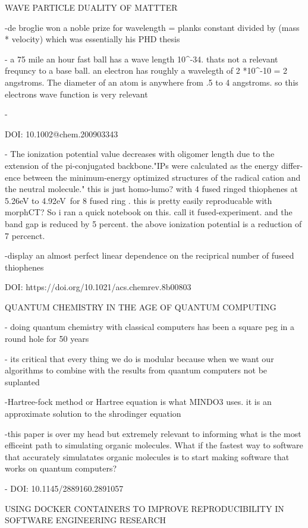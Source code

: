     WAVE PARTICLE DUALITY OF MATTTER

    -de broglie won a noble prize for wavelength = planks constant divided by (mass * velocity) which was 
    essentially his PHD thesis

    - a 75 mile an hour fast ball has  a wave length 10^-34. thats not a relevant frequncy
    to a base ball. an electron has roughly a wavelegth of 2 *10^{-10} = 2 angstroms. The diameter of
    an atom is anywhere from .5 to 4 angstroms. so this electrons wave function is very relevant

    -

DOI: 10.1002@chem.200903343

    - The ionization potential value decreases with oligomer length due to the extension of
    the pi-conjugated backbone."IPs were calculated as the energy differ- ence between 
    the minimum-energy optimized structures of the radical cation and the neutral molecule." 
    this is just homo-lumo?  with 4 fused ringed thiophenes at 5.26eV to 4.92eV for 8 fused
    ring . this is pretty easily reproducable with morphCT? So i ran a quick notebook on this.
    call it fused-experiment. and the band gap is reduced by 5 percent. the above ionization potential
    is a reduction of 7 percenct. 

    -display an almost perfect linear dependence on the reciprical number of fuseed thiophenes

DOI: https://doi.org/10.1021/acs.chemrev.8b00803
    
    QUANTUM CHEMISTRY IN THE AGE OF QUANTUM COMPUTING

    - doing quantum chemistry with classical computers has been a square peg in a round hole for
    50 years

    - its critical that every thing we do is modular because when we want our algorithms to 
    combine with the results from quantum computers not be suplanted

    -Hartree-fock method or Hartree equation is what MINDO3 uses. it is an approximate solution
    to the shrodinger equation 

    -this paper is over my head but extremely relevant to informing what is the most efficeint
    path to simulating organic molecules. What if the fastest way to software that accurately 
    simulatates organic molecules is to start making software that works on quantum computers?

    -
DOI: 10.1145/2889160.2891057

    USING DOCKER CONTAINERS TO IMPROVE REPRODUCIBILITY IN SOFTWARE ENGINEERING RESEARCH

